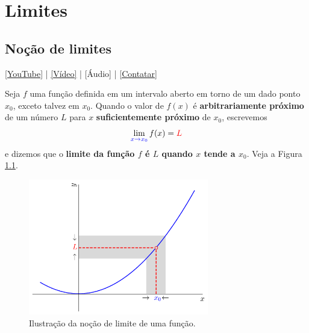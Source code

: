 
\chapter{Limites}\label{cap_lim}
\thispagestyle{fancy}

\section{Noção de limites}\label{cap_lim_sec_lim}

\begin{flushright}
  \href{https://youtu.be/OxqOaaEIOjo}{[YouTube]} | \href{https://archive.org/details/nocaolim}{[Vídeo]} | [Áudio] | \href{https://phkonzen.github.io/notas/contato.html}{[Contatar]}
\end{flushright}

Seja $f$ uma função definida em um intervalo aberto em torno de um dado ponto $x_0$, exceto talvez em $x_0$. Quando o valor de $f(x)$ é {\bf arbitrariamente próximo} de um número $L$ para $x$ {\bf suficientemente próximo} de $x_0$, escrevemos
\begin{equation}
  \lim_{\color{blue}x\to x_0} f(x) = {\color{red}L}
\end{equation}
e dizemos que o {\bf limite da função $f$ é $L$ quando $x$ tende a $x_0$}. Veja a Figura \ref{fig:lim}.

\begin{figure}[H]
  \centering
  \includegraphics[width=0.7\textwidth]{./cap_lim/dados/fig_lim/fig_lim}
  \caption{Ilustração da noção de limite de uma função.}
  \label{fig:lim}
\end{figure}

